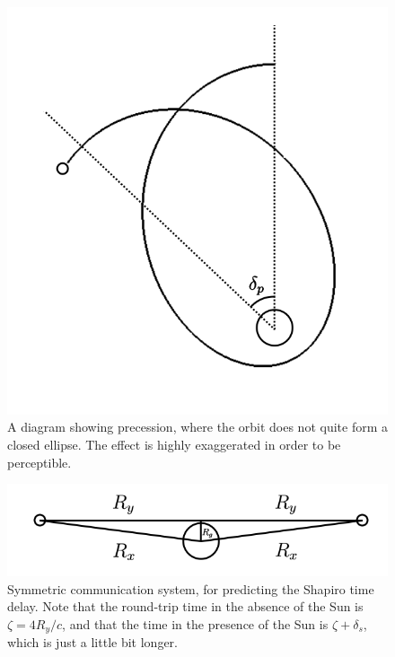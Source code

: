 \documentclass[12pt]{article}
\begin{document}
\begin{figure} 
\centering
\label{fig2}
  \includegraphics[width = 6 in]{precession.png}
  \caption{ A diagram showing precession, where the orbit does not quite form a closed ellipse.
The effect is highly exaggerated in order to be perceptible.
}
\end{figure}



\begin{figure} 
\centering
\label{fig3}
  \includegraphics[width =6 in]{comm.png}
  \caption{ Symmetric communication system, for predicting the Shapiro time delay.
Note that the round-trip time in the absence of the Sun is $\zeta = 4 R_y / c$, and that the time in the presence of the Sun is $\zeta + \delta_{s}$, which is just a little bit longer.
}
\end{figure}
\end{document}
